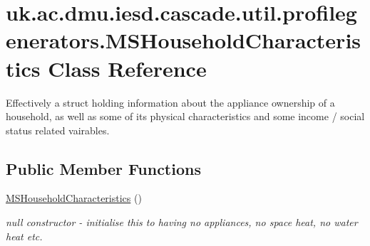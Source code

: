 \hypertarget{classuk_1_1ac_1_1dmu_1_1iesd_1_1cascade_1_1util_1_1profilegenerators_1_1_m_s_household_characteristics}{\section{uk.\-ac.\-dmu.\-iesd.\-cascade.\-util.\-profilegenerators.\-M\-S\-Household\-Characteristics Class Reference}
\label{classuk_1_1ac_1_1dmu_1_1iesd_1_1cascade_1_1util_1_1profilegenerators_1_1_m_s_household_characteristics}
}


Effectively a struct holding information about the appliance ownership of a household, as well as some of its physical characteristics and some income / social status related vairables.  


\subsection*{Public Member Functions}
\begin{DoxyCompactItemize}
\item 
\hyperlink{classuk_1_1ac_1_1dmu_1_1iesd_1_1cascade_1_1util_1_1profilegenerators_1_1_m_s_household_characteristics_a0a80264bb3a11987b796a052182fd353}{M\-S\-Household\-Characteristics} ()
\begin{DoxyCompactList}\small\item\em null constructor -\/ initialise this to having no appliances, no space heat, no water heat etc. \end{DoxyCompactList}\end{DoxyCompactItemize}

